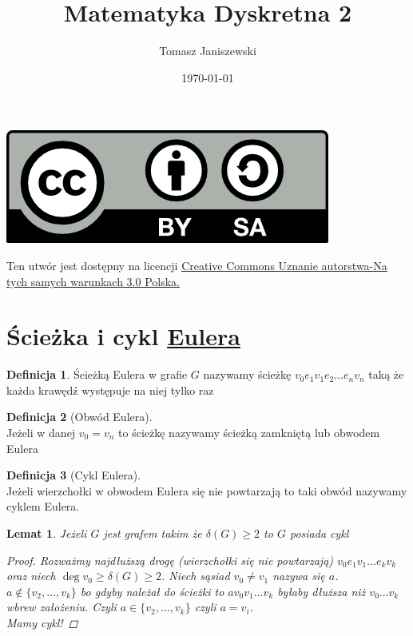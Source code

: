 \documentclass[12pt,a4paper]{article}
\title{ Matematyka Dyskretna 2}
\author{Tomasz Janiszewski}
\date{\today}
\newtheorem{lemat}{Lemat}
\theoremstyle{definition}
\newtheorem{df}{Definicja}
\begin{document}
\maketitle

\tableofcontents

\begin{center}
\leavevmode
\includegraphics[width=1 in]{../img/by-sa.png}
\end{center}
\label{fig:cc}
\scriptsize{Ten utwór jest dostępny na licencji  \href{http://creativecommons.org/licenses/by-sa/3.0/pl/}{Creative Commons Uznanie autorstwa-Na tych samych warunkach 3.0 Polska.}}

\pagebreak
\section{Ścieżka i cykl \href{http://pl.wikipedia.org/wiki/Leonhard_Euler}{Eulera}}
\begin{df}
Ścieżką Eulera w grafie $G$ nazywamy ścieżkę $v_0e_1v_1e_2 \dots e_nv_n$ taką że każda krawędź występuje na niej tylko raz
\end{df}
\begin{df}[Obwód Eulera]~\\
Jeżeli w danej $v_0 = v_n$ to ścieżkę nazywamy ścieżką zamkniętą lub obwodem Eulera
\end{df}
\begin{df}[Cykl Eulera]~\\
Jeżeli wierzchołki  w obwodem Eulera się nie powtarzają to taki obwód nazywamy cyklem Eulera.
\end{df}

\begin{lemat}\label{lemat:1}
Jeżeli $G$ jest grafem takim że $\delta (G) \geqslant 2$ to $G$ posiada cykl
\begin{proof}
Rozważmy najdłuższą drogę (wierzchołki się nie powtarzają) $v_0e_1v_1 \dots e_kv_k$ oraz niech $\deg v_0 \geqslant \delta(G) \geqslant 2$. Niech sąsiad $v_0 \neq v_1$ nazywa się $a$. $a \not\in \{v_2, \dots, v_k\}$ bo gdyby należał do ścieżki to $av_0v_1 \dots v_k$ byłaby dłuższa niż $v_0 \dots v_k$ wbrew założeniu. Czyli $a\in \{v_2, \dots, v_k\}$ czyli $a = v_i$.\\ Mamy cykl! 
\end{proof}
\end{lemat}
\end{document}
